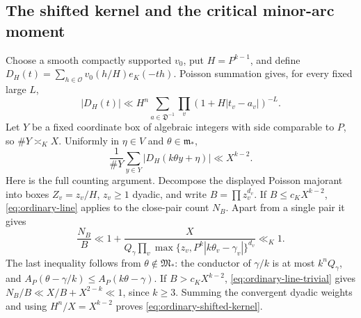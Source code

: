\documentclass[11pt,reqno]{amsart}
\numberwithin{equation}{section}
\theoremstyle{definition}
\begin{document}
\subsection{The shifted kernel and the critical minor-arc moment}

Choose a smooth compactly supported $v_0$, put $H=P^{k-1}$, and define
$D_H(t)=\sum_{h\in\mathcal O}v_0(h/H)e_K(-th)$.
Poisson summation gives, for every fixed large $L$,
\[
 |D_H(t)|\ll H^n\sum_{a\in\mathfrak D^{-1}}
             \prod_v(1+H|t_v-a_v|)^{-L}.
\]
Let $Y$ be a fixed coordinate box of algebraic integers with side comparable
to $P$, so $\#Y\asymp_KX$.  Uniformly in $\eta\in V$ and
$\theta\in\mathfrak m_*$,
\begin{equation}\label{eq:ordinary-shifted-kernel}
 \frac1{\#Y}\sum_{y\in Y}|D_H(k\theta y+\eta)|\ll X^{k-2}.
\end{equation}
Here is the full counting argument.
Decompose the displayed Poisson majorant into boxes
$Z_v=z_v/H$, $z_v\ge1$ dyadic, and write $B=\prod z_v^{d_v}$.
If $B\le c_KX^{k-2}$, \eqref{eq:ordinary-line} applies to the close-pair
count $N_B$.  Apart from a single pair it gives
\[
 \frac{N_B}{B}\ll 1+
 \frac{X}{Q_\gamma
   \prod_v\max\{z_v,P^k|k\theta_v-\gamma_v|\}^{d_v}}
 \ll_K1.
\]
The last inequality follows from $\theta\notin\mathfrak M_*$:
the conductor of $\gamma/k$ is at most $k^nQ_\gamma$, and
$A_P(\theta-\gamma/k)\le A_P(k\theta-\gamma)$.
If $B>c_KX^{k-2}$, \eqref{eq:ordinary-line-trivial} gives
$N_B/B\ll X/B+X^{2-k}\ll1$, since $k\ge3$.
Summing the convergent dyadic weights and using $H^n/X=X^{k-2}$ proves
\eqref{eq:ordinary-shifted-kernel}.
\end{document}
